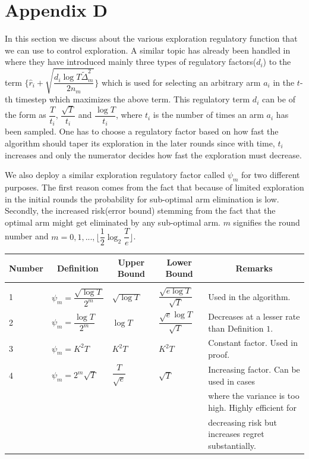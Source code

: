 \section{Appendix D}

In this section we discuss about the various exploration regulatory function that we can use to control exploration. A similar topic has already been handled in \cite{liu2016modification} where they have introduced mainly three types of regulatory factors($d_{i}$) to the term $\bigg\lbrace\hat{r}_{i}+\sqrt{\dfrac{d_{i}\log T\tilde{\Delta}_{m}^{2}}{2n_{m}}}\bigg\rbrace$ which is used for selecting an arbitrary arm $a_{i}$ in the $t$-th timestep which maximizes the above term. This regulatory term $d_{i}$ can be of the form as $\dfrac{T}{t_{i}}$, $\dfrac{\sqrt{T}}{t_{i}}$ and $\dfrac{\log T}{t_{i}}$, where $t_{i}$ is the number of times an arm $a_{i}$ has been sampled. One has to choose a regulatory factor based on how fast the algorithm should taper its exploration in the later rounds since with time, $t_{i}$ increases and only the numerator decides how fast the exploration must decrease.

	We also deploy a similar exploration regulatory factor called $\psi_{m}$ for two different purposes. The first reason comes from the fact that because of limited exploration in the initial rounds the probability for sub-optimal arm elimination is low. Secondly, the increased risk(error bound) stemming from the fact that the optimal arm might get eliminated by any sub-optimal arm. $m$ signifies the round number and $m=0,1,...,\big \lfloor \dfrac{1}{2}\log_{2} \dfrac{T}{e}\big\rfloor$.
	
\begin{center}
\begin{tabular}{l|l|l|l|l}
\multicolumn{1}{c}{\bf Number} &\multicolumn{1}{c}{\bf Definition}  &\multicolumn{1}{c}{\bf Upper Bound} &\multicolumn{1}{c}{\bf Lower Bound} &\multicolumn{1}{c}{\bf Remarks} \\
\hline \\
1	&$\psi_{m}=\dfrac{\sqrt{\log T}}{2^{m}}$         & $\sqrt{\log T}$  &$\dfrac{\sqrt{e\log T}}{\sqrt{T}}$ & Used in the algorithm. \\ 
2	&$\psi_{m}=\dfrac{\log T}{2^{m}}$         & $\log T$  &$\dfrac{\sqrt{e}\log T}{\sqrt{T}}$ & Decreases at a lesser rate than Definition $1$.  \\  
3	&$\psi_{m}=K^{2}T$         & $K^{2} T$  &$K^{2} T$ & Constant factor. Used in proof. \\  
4	&$\psi_{m}=2^{m}\sqrt{T}$         & $\dfrac{T}{\sqrt{e}}$  &$\sqrt{T}$ & Increasing factor. Can be used in cases \\&&&& where the variance is too high. Highly efficient for \\&&&& decreasing risk but increases regret substantially. \\  
\end{tabular}
\end{center}	
	
